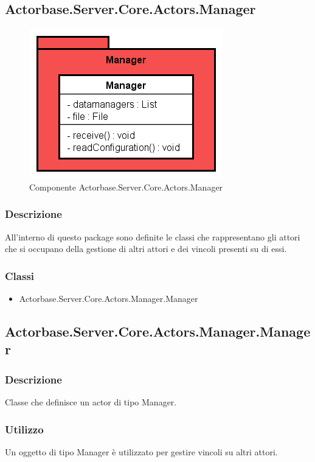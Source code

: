 \documentclass[a4paper]{article}
\begin{document}
		\subsection{Actorbase.Server.Core.Actors.Manager}
			\begin{figure} [H]
			\centering
			\includegraphics[scale=0.65]{Server/Package/ManagerLevel.png}
			\caption{Componente Actorbase.Server.Core.Actors.Manager}
			\end{figure}
			\subsubsection{Descrizione}
				All'interno di questo package sono definite le classi che rappresentano gli attori che si occupano della gestione di altri attori e dei vincoli presenti su di essi.
			\subsubsection{Classi}
			\begin{itemize}
				\item Actorbase.Server.Core.Actors.Manager.Manager
			\end{itemize}
			
		\subsection{Actorbase.Server.Core.Actors.Manager.Manager}
			\subsubsection{Descrizione}
				Classe che definisce un actor di tipo Manager.
			\subsubsection{Utilizzo}
				Un oggetto di tipo Manager è utilizzato per gestire vincoli su altri attori.
\end{document}
